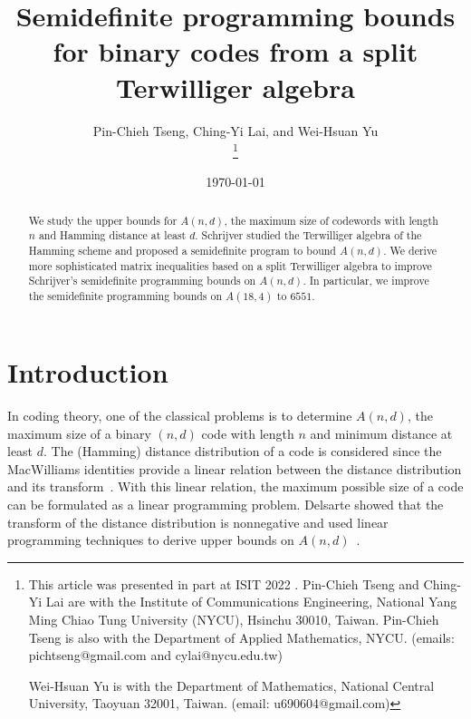 \documentclass[final,onecolumn]{IEEEtran}
\theoremstyle{definition}
\begin{document}
	
	
\title{Semidefinite programming bounds for binary codes from a split Terwilliger algebra}
\author{Pin-Chieh Tseng, Ching-Yi Lai, and Wei-Hsuan Yu
		
\thanks{\footnotesize This article was presented in part at ISIT 2022 \cite{PLY22}.
Pin-Chieh Tseng and Ching-Yi Lai are with the Institute of Communications Engineering, National Yang Ming Chiao Tung University (NYCU), Hsinchu 30010, Taiwan. Pin-Chieh Tseng is also with the Department of Applied Mathematics, NYCU. (emails: pichtseng@gmail.com and cylai@nycu.edu.tw)
			
Wei-Hsuan Yu is with the Department of Mathematics, National Central University, Taoyuan 32001, Taiwan. (email: u690604@gmail.com)
			
}}
	
\date{\today}
	
	
\maketitle
	
\begin{abstract}
We study the upper bounds for $A(n,d)$, the maximum size of codewords with length $n$ and Hamming distance at least $d$. Schrijver studied the Terwilliger algebra of the Hamming scheme and proposed a semidefinite program to bound $A(n, d)$. We derive more sophisticated matrix inequalities based on a split Terwilliger algebra to improve Schrijver's semidefinite programming bounds on $A(n, d)$. In particular, we improve the semidefinite programming bounds on $A(18,4)$ to $6551$.
\end{abstract}
	
	

	
\section{Introduction}
In coding theory, one of the classical problems is to determine $A(n, d)$, the maximum size of a binary $(n,d)$ code with length $n$ and minimum distance at least $d$. The (Hamming) distance distribution of a code is considered since  the MacWilliams identities provide a linear relation between the distance distribution and its transform~\cite{MS77}. With this linear relation, the maximum possible size of a code can be formulated as  {a linear programming problem}. Delsarte showed that the transform of the distance distribution is nonnegative and used linear programming techniques to derive upper bounds on  $A(n, d)$~\cite{Del73}.
 
\end{document}
